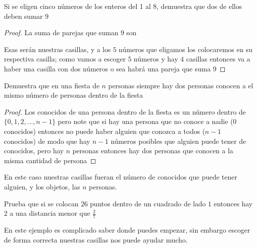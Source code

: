 \documentclass[11pt]{scrartcl}
\begin{document}
\begin{example}
    Si se eligen cinco números de los enteros del 1 al 8, demuestra que dos de ellos deben sumar $9$

\end{example}

\begin{proof}
    La suma de parejas que suman $9$ son
    \begin{center}



    \end{center}
    Esas serán nuestras casillas, y a los $5$ números que eligamos los colocaremos en su respectiva casilla; como vamos a escoger $5$ números y hay $4$ casillas entonces va a haber una casilla con dos números o sea habrá una pareja que suma $9$
\end{proof}
\begin{example}
    Demuestra que en una fiesta de $n$ personas siempre hay dos personas conocen a el mismo número de personas dentro de la fiesta
\end{example}
\begin{proof}
    Los conocidos de una persona dentro de la fiesta es un número dentro de $\{0,1,2,\ldots,n-1\}$ pero note que si hay una persona que no conoce a nadie (0 conocidos) entonces no puede haber alguien que conozca a todos ($n-1$ conocidos) de modo que hay $n-1$ números posibles que alguien puede tener de conocidos, pero hay $n$ personas entonces hay dos personas que conocen a la misma cantidad de persona
\end{proof}
En este caso nuestras casillas fueran el número de conocidos que puede tener alguien, y los objetos, las $n$ personas.
\begin{example}
   Prueba que si se colocan $26$ puntos dentro de un cuadrado de lado $1$ entonces hay $2$ a una distancia menor que $\frac{2}{7}$
\end{example}
En este ejemplo es complicado saber donde puedes empezar, sin embargo escoger de forma correcta nuestras casillas nos puede ayudar mucho.
\end{document}
